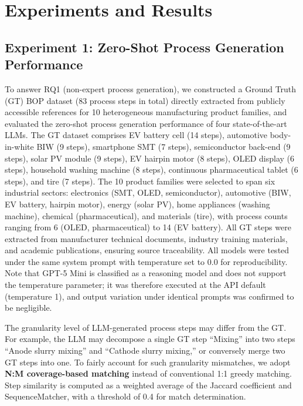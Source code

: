 \documentclass[conference]{IEEEtran}
\begin{document}
\section{Experiments and Results}

\subsection{Experiment 1: Zero-Shot Process Generation Performance}

To answer RQ1 (non-expert process generation), we constructed a Ground Truth (GT) BOP dataset (83 process steps in total) directly extracted from publicly accessible references for 10 heterogeneous manufacturing product families, and evaluated the zero-shot process generation performance of four state-of-the-art LLMs. The GT dataset comprises EV battery cell (14 steps), automotive body-in-white BIW (9 steps), smartphone SMT (7 steps), semiconductor back-end (9 steps), solar PV module (9 steps), EV hairpin motor (8 steps), OLED display (6 steps), household washing machine (8 steps), continuous pharmaceutical tablet (6 steps), and tire (7 steps). The 10 product families were selected to span six industrial sectors: electronics (SMT, OLED, semiconductor), automotive (BIW, EV battery, hairpin motor), energy (solar PV), home appliances (washing machine), chemical (pharmaceutical), and materials (tire), with process counts ranging from 6 (OLED, pharmaceutical) to 14 (EV battery). All GT steps were extracted from manufacturer technical documents, industry training materials, and academic publications, ensuring source traceability. All models were tested under the same system prompt with temperature set to 0.0 for reproducibility. Note that GPT-5 Mini is classified as a reasoning model and does not support the temperature parameter; it was therefore executed at the API default (temperature 1), and output variation under identical prompts was confirmed to be negligible.

The granularity level of LLM-generated process steps may differ from the GT. For example, the LLM may decompose a single GT step ``Mixing'' into two steps ``Anode slurry mixing'' and ``Cathode slurry mixing,'' or conversely merge two GT steps into one. To fairly account for such granularity mismatches, we adopt \textbf{N:M coverage-based matching} instead of conventional 1:1 greedy matching. Step similarity is computed as a weighted average of the Jaccard coefficient and SequenceMatcher, with a threshold of 0.4 for match determination.
\end{document}
